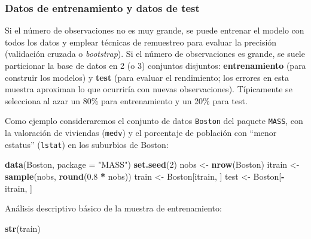 \documentclass[
]{book}
\newenvironment{Shaded}{\begin{snugshade}}{\end{snugshade}}
\newcommand{\AttributeTok}[1]{\textcolor[rgb]{0.13,0.29,0.53}{#1}}
\newcommand{\DecValTok}[1]{\textcolor[rgb]{0.00,0.00,0.81}{#1}}
\newcommand{\FloatTok}[1]{\textcolor[rgb]{0.00,0.00,0.81}{#1}}
\newcommand{\FunctionTok}[1]{\textcolor[rgb]{0.13,0.29,0.53}{\textbf{#1}}}
\newcommand{\NormalTok}[1]{#1}
\newcommand{\OtherTok}[1]{\textcolor[rgb]{0.56,0.35,0.01}{#1}}
\newcommand{\SpecialCharTok}[1]{\textcolor[rgb]{0.81,0.36,0.00}{\textbf{#1}}}
\newcommand{\StringTok}[1]{\textcolor[rgb]{0.31,0.60,0.02}{#1}}
\theoremstyle{break}
\theoremstyle{nonumberplain}
\begin{document}
\subsubsection{Datos de entrenamiento y datos de test}\label{entrenamiento-test}

Si el número de observaciones no es muy grande, se puede entrenar el modelo con todos los datos y emplear técnicas de remuestreo para evaluar la precisión (validación cruzada o \emph{bootstrap}). Si el número de observaciones es grande, se suele particionar la base de datos en 2 (o 3) conjuntos disjuntos: \textbf{entrenamiento} (para construir los modelos) y \textbf{test} (para evaluar el rendimiento; los errores en esta muestra aproximan lo que ocurriría con nuevas observaciones). Típicamente se selecciona al azar un 80\% para entrenamiento y un 20\% para test.

Como ejemplo consideraremos el conjunto de datos \texttt{Boston} del paquete \texttt{MASS}, con la valoración de viviendas (\texttt{medv}) y el porcentaje de población con ``menor estatus'' (\texttt{lstat}) en los suburbios de Boston:

\begin{Shaded}
\begin{Highlighting}[]
\FunctionTok{data}\NormalTok{(Boston, }\AttributeTok{package =} \StringTok{"MASS"}\NormalTok{)}
\FunctionTok{set.seed}\NormalTok{(}\DecValTok{2}\NormalTok{)}
\NormalTok{nobs }\OtherTok{\textless{}{-}} \FunctionTok{nrow}\NormalTok{(Boston)}
\NormalTok{itrain }\OtherTok{\textless{}{-}} \FunctionTok{sample}\NormalTok{(nobs, }\FunctionTok{round}\NormalTok{(}\FloatTok{0.8} \SpecialCharTok{*}\NormalTok{ nobs))}
\NormalTok{train }\OtherTok{\textless{}{-}}\NormalTok{ Boston[itrain, ]}
\NormalTok{test }\OtherTok{\textless{}{-}}\NormalTok{ Boston[}\SpecialCharTok{{-}}\NormalTok{itrain, ]}
\end{Highlighting}
\end{Shaded}

Análisis descriptivo básico de la muestra de entrenamiento:

\begin{Shaded}
\begin{Highlighting}[]
\FunctionTok{str}\NormalTok{(train)}
\end{Highlighting}
\end{Shaded}
\end{document}
